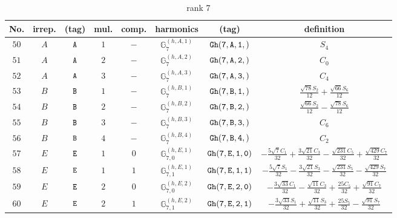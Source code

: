\documentclass[fleqn,8pt]{jsarticle}
\begin{document}
\begin{table}[ht!]
\begin{center}
\caption{rank 7}
\renewcommand{\arraystretch}{1.3}
\begin{tabular}{cccccccc} \hline \hline
No. & irrep. & (tag) & mul. & comp. & harmonics & (tag) & definition \\ \hline
$ 50 $ & $ A $ & $ {\tt A} $ & $ 1 $ & $ - $ & $ \mathbb{G}_{7}^{(h,A,1)} $ & $ {\tt Gh(7,A,1,)} $ & $ S_{4} $ \\
$ 51 $ & $ A $ & $ {\tt A} $ & $ 2 $ & $ - $ & $ \mathbb{G}_{7}^{(h,A,2)} $ & $ {\tt Gh(7,A,2,)} $ & $ C_{0} $ \\
$ 52 $ & $ A $ & $ {\tt A} $ & $ 3 $ & $ - $ & $ \mathbb{G}_{7}^{(h,A,3)} $ & $ {\tt Gh(7,A,3,)} $ & $ C_{4} $ \\
$ 53 $ & $ B $ & $ {\tt B} $ & $ 1 $ & $ - $ & $ \mathbb{G}_{7}^{(h,B,1)} $ & $ {\tt Gh(7,B,1,)} $ & $ \frac{\sqrt{78} S_{2}}{12} + \frac{\sqrt{66} S_{6}}{12} $ \\
$ 54 $ & $ B $ & $ {\tt B} $ & $ 2 $ & $ - $ & $ \mathbb{G}_{7}^{(h,B,2)} $ & $ {\tt Gh(7,B,2,)} $ & $ \frac{\sqrt{66} S_{2}}{12} - \frac{\sqrt{78} S_{6}}{12} $ \\
$ 55 $ & $ B $ & $ {\tt B} $ & $ 3 $ & $ - $ & $ \mathbb{G}_{7}^{(h,B,3)} $ & $ {\tt Gh(7,B,3,)} $ & $ C_{6} $ \\
$ 56 $ & $ B $ & $ {\tt B} $ & $ 4 $ & $ - $ & $ \mathbb{G}_{7}^{(h,B,4)} $ & $ {\tt Gh(7,B,4,)} $ & $ C_{2} $ \\
$ 57 $ & $ E $ & $ {\tt E} $ & $ 1 $ & $ 0 $ & $ \mathbb{G}_{7,0}^{(h,E,1)} $ & $ {\tt Gh(7,E,1,0)} $ & $ - \frac{5 \sqrt{7} C_{1}}{32} + \frac{3 \sqrt{21} C_{3}}{32} - \frac{\sqrt{231} C_{5}}{32} + \frac{\sqrt{429} C_{7}}{32} $ \\
$ 58 $ & $ E $ & $ {\tt E} $ & $ 1 $ & $ 1 $ & $ \mathbb{G}_{7,1}^{(h,E,1)} $ & $ {\tt Gh(7,E,1,1)} $ & $ - \frac{5 \sqrt{7} S_{1}}{32} - \frac{3 \sqrt{21} S_{3}}{32} - \frac{\sqrt{231} S_{5}}{32} - \frac{\sqrt{429} S_{7}}{32} $ \\
$ 59 $ & $ E $ & $ {\tt E} $ & $ 2 $ & $ 0 $ & $ \mathbb{G}_{7,0}^{(h,E,2)} $ & $ {\tt Gh(7,E,2,0)} $ & $ - \frac{3 \sqrt{33} C_{1}}{32} - \frac{\sqrt{11} C_{3}}{32} + \frac{25 C_{5}}{32} + \frac{\sqrt{91} C_{7}}{32} $ \\
$ 60 $ & $ E $ & $ {\tt E} $ & $ 2 $ & $ 1 $ & $ \mathbb{G}_{7,1}^{(h,E,2)} $ & $ {\tt Gh(7,E,2,1)} $ & $ - \frac{3 \sqrt{33} S_{1}}{32} + \frac{\sqrt{11} S_{3}}{32} + \frac{25 S_{5}}{32} - \frac{\sqrt{91} S_{7}}{32} $ \\

\end{tabular}
\end{center}
\end{table}
\end{document}
